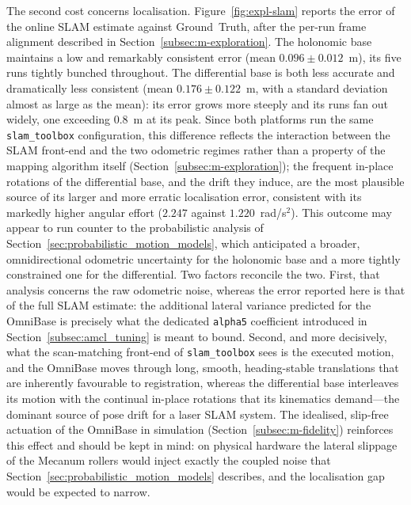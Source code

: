 The second cost concerns localisation. Figure~\ref{fig:expl-slam} reports the error of the online SLAM estimate against Ground~Truth, after the per-run frame alignment described in Section~\ref{subsec:m-exploration}. The holonomic base maintains a low and remarkably consistent error (mean $0.096 \pm 0.012$~m), its five runs tightly bunched throughout. The differential base is both less accurate and dramatically less consistent (mean $0.176 \pm 0.122$~m, with a standard deviation almost as large as the mean): its error grows more steeply and its runs fan out widely, one exceeding $0.8$~m at its peak. Since both platforms run the same \texttt{slam\_toolbox} configuration, this difference reflects the interaction between the SLAM front-end and the two odometric regimes rather than a property of the mapping algorithm itself (Section~\ref{subsec:m-exploration}); the frequent in-place rotations of the differential base, and the drift they induce, are the most plausible source of its larger and more erratic localisation error, consistent with its markedly higher angular effort ($2.247$ against $1.220$~rad/s$^2$). This outcome may appear to run counter to the probabilistic analysis of Section~\ref{sec:probabilistic_motion_models}, which anticipated a broader, omnidirectional odometric uncertainty for the holonomic base and a more tightly constrained one for the differential. Two factors reconcile the two. First, that analysis concerns the raw odometric noise, whereas the error reported here is that of the full SLAM estimate: the additional lateral variance predicted for the OmniBase is precisely what the dedicated \texttt{alpha5} coefficient introduced in Section~\ref{subsec:amcl_tuning} is meant to bound. Second, and more decisively, what the scan-matching front-end of \texttt{slam\_toolbox} sees is the executed motion, and the OmniBase moves through long, smooth, heading-stable translations that are inherently favourable to registration, whereas the differential base interleaves its motion with the continual in-place rotations that its kinematics demand—the dominant source of pose drift for a laser SLAM system. The idealised, slip-free actuation of the OmniBase in simulation (Section~\ref{subsec:m-fidelity}) reinforces this effect and should be kept in mind: on physical hardware the lateral slippage of the Mecanum rollers would inject exactly the coupled noise that Section~\ref{sec:probabilistic_motion_models} describes, and the localisation gap would be expected to narrow.

